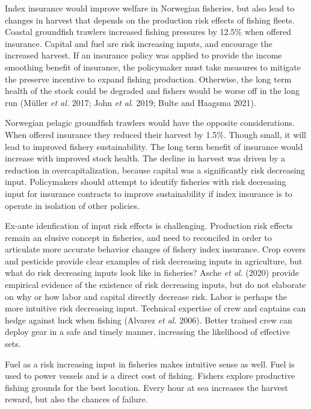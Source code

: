 \documentclass[
  letterpaper,
  DIV=11,
  numbers=noendperiod]{scrartcl}
\theoremstyle{plain}
\theoremstyle{plain}
\theoremstyle{remark}
\begin{document}
Index insurance would improve welfare in Norwegian fisheries, but also
lead to changes in harvest that depends on the production risk effects
of fishing fleets. Coastal groundfish trawlers increased fishing
pressures by 12.5\% when offered insurance. Capital and fuel are risk
increasing inputs, and encourage the increased harvest. If an insurance
policy was applied to provide the income smoothing benefit of insurance,
the policymaker must take measures to mitigate the preserve incentive to
expand fishing production. Otherwise, the long term health of the stock
could be degraded and fishers would be worse off in the long run (Müller
\emph{et al.} 2017; John \emph{et al.} 2019; Bulte and Haagsma 2021).

Norwegian pelagic groundfish trawlers would have the opposite
considerations. When offered insurance they reduced their harvest by
1.5\%. Though small, it will lead to improved fishery sustainability.
The long term benefit of insurance would increase with improved stock
health. The decline in harvest was driven by a reduction in
overcapitalization, because capital was a significantly risk decreasing
input. Policymakers should attempt to identify fisheries with risk
decreasing input for insurance contracts to improve sustainability if
index insurance is to operate in isolation of other policies.

Ex-ante idenfication of input risk effects is challenging. Production
risk effects remain an elusive concept in fisheries, and need to
reconciled in order to articulate more accurate behavior changes of
fishery index insurance. Crop covers and pesticide provide clear
examples of risk decreasing inputs in agriculture, but what do risk
decreasing inputs look like in fisheries? Asche \emph{et al.} (2020)
provide empirical evidence of the existence of risk decreasing inputs,
but do not elaborate on why or how labor and capital directly decrease
risk. Labor is perhaps the more intuitive risk decreasing input.
Technical expertise of crew and captains can hedge against luck when
fishing (Alvarez \emph{et al.} 2006). Better trained crew can deploy
gear in a safe and timely manner, increasing the likelihood of effective
sets.

Fuel as a risk increasing input in fisheries makes intuitive sense as
well. Fuel is used to power vessels and is a direct cost of fishing.
Fishers explore productive fishing grounds for the best location. Every
hour at sea increases the harvest reward, but also the chances of
failure.
\end{document}
